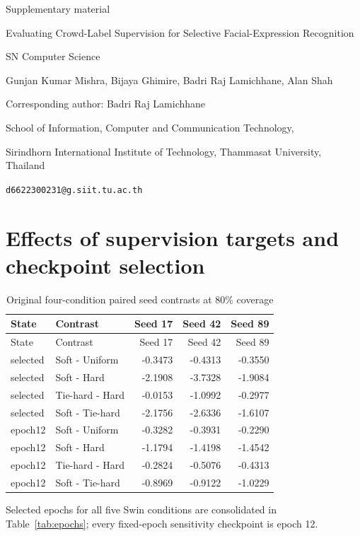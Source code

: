 \documentclass[10pt]{article}
\begin{document}
\begin{center}
{\Large Supplementary material}\par\medskip
Evaluating Crowd-Label Supervision for Selective Facial-Expression Recognition\par\medskip
SN Computer Science\par\smallskip
Gunjan Kumar Mishra, Bijaya Ghimire, Badri Raj Lamichhane, Alan Shah\par\smallskip
Corresponding author: Badri Raj Lamichhane\par
School of Information, Computer and Communication Technology,\par
Sirindhorn International Institute of Technology, Thammasat University, Thailand\par
\texttt{d6622300231@g.siit.tu.ac.th}
\end{center}


\clearpage\section{Effects of supervision targets and checkpoint selection}\label{supp:targets}
\begin{longtable}{llrrr}
\caption{Original four-condition paired seed contrasts at 80\% coverage}\label{tab:seeds}\\
\toprule State & Contrast & Seed 17 & Seed 42 & Seed 89\\\midrule\endfirsthead
\toprule State & Contrast & Seed 17 & Seed 42 & Seed 89\\\midrule\endhead
selected & Soft - Uniform & -0.3473 & -0.4313 & -0.3550\\
selected & Soft - Hard & -2.1908 & -3.7328 & -1.9084\\
selected & Tie-hard - Hard & -0.0153 & -1.0992 & -0.2977\\
selected & Soft - Tie-hard & -2.1756 & -2.6336 & -1.6107\\
epoch12 & Soft - Uniform & -0.3282 & -0.3931 & -0.2290\\
epoch12 & Soft - Hard & -1.1794 & -1.4198 & -1.4542\\
epoch12 & Tie-hard - Hard & -0.2824 & -0.5076 & -0.4313\\
epoch12 & Soft - Tie-hard & -0.8969 & -0.9122 & -1.0229\\
\bottomrule\end{longtable}
Selected epochs for all five Swin conditions are consolidated in Table~\ref{tab:epochs}; every fixed-epoch sensitivity checkpoint is epoch 12.
\end{document}
